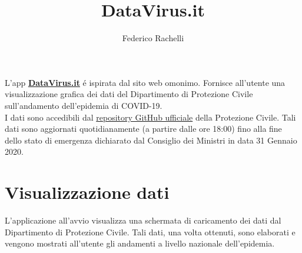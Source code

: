 \documentclass{article}
\begin{document}
    \author{Federico Rachelli}
    \title{\vspace{-2cm}DataVirus.it}
    \maketitle

    L'app \textbf{\href{https://datavirus.it}{DataVirus.it}} é ispirata dal sito web omonimo.
    Fornisce all'utente una visualizzazione grafica dei dati del Dipartimento di Protezione Civile sull'andamento dell'epidemia di COVID-19.
    \\
    I dati sono accedibili dal \href{https://github.com/pcm-dpc/COVID-19}{repository GitHub ufficiale} della Protezione Civile. 
    Tali dati sono aggiornati quotidianamente (a partire dalle ore 18:00) fino alla fine dello stato di emergenza dichiarato dal Consiglio dei Ministri in data 31 Gennaio 2020.
    
    \section{Visualizzazione dati}
    L'applicazione all'avvio visualizza una schermata di caricamento dei dati dal Dipartimento di Protezione Civile. 
    Tali dati, una volta ottenuti, sono elaborati e vengono mostrati all'utente gli andamenti a livello nazionale dell'epidemia.
    
\end{document}
